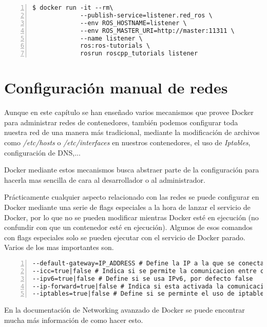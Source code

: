 	\begin{lstlisting}[style=consola,numbers=left]
$ docker run -it --rm\
             --publish-service=listener.red_ros \
             --env ROS_HOSTNAME=listener \
             --env ROS_MASTER_URI=http://master:11311 \
             --name listener \
             ros:ros-tutorials \
             rosrun roscpp_tutorials listener
	\end{lstlisting}

\fi
	
	\section{Configuración manual de redes}
	Aunque en este capítulo se han enseñado varios mecanismos que provee Docker para administrar redes de contenedores, también podemos configurar toda nuestra red de una manera más tradicional, mediante la modificación de archivos como \emph{/etc/hosts} o \emph{/etc/interfaces} en nuestros contenedores, el uso de \emph{Iptables}, configuración de DNS,... 
	
	Docker mediante estos mecanismos busca abstraer parte de la configuración para hacerla mas sencilla de cara al desarrollador o al administrador.
	
	Prácticamente cualquier aspecto relacionado con las redes se puede configurar en Docker mediante una serie de flags especiales a la hora de lanzar el servicio de Docker, por lo que no se pueden modificar mientras Docker esté en ejecución (no confundir con que un contenedor esté en ejecución). Algunos de esos comandos con flags especiales solo se pueden ejecutar con el servicio de Docker parado. Varios de los mas importantes son.
	
	\begin{lstlisting}[style=consola,numbers=left]
--default-gateway=IP_ADDRESS # Define la IP a la que se conectaran los contenedores de Docker al crearse, por defecto se usa la de docker0
--icc=true|false # Indica si se permite la comunicacion entre contenedores, por defecto true
--ipv6=true|false # Define si se usa IPv6, por defecto false
--ip-forward=true|false # Indica si esta activada la comunicacion entre los contenedores y el exterior, por defecto true
--iptables=true|false # Define si se perminte el uso de iptables (filtra direcciones y puertos, se usa como firewall en sistemas tipo UNIX)
	\end{lstlisting}
	
	En la documentación de Networking avanzado de Docker \cite{docker-network-advanced} se puede encontrar mucha más información de como hacer esto.
	